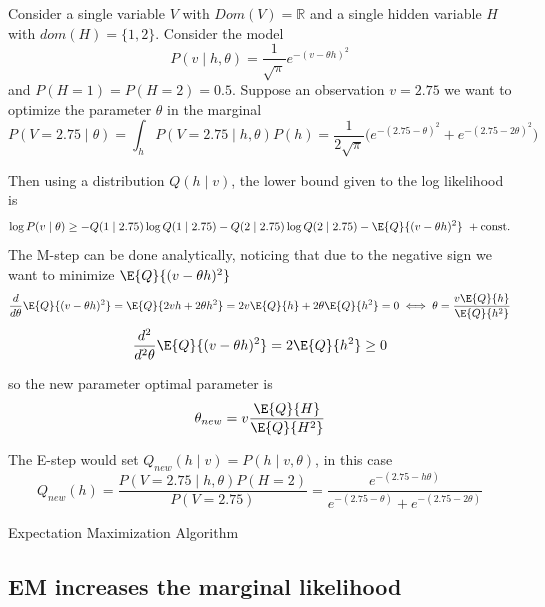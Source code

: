 \begin{exampleth}
  Consider a single variable \(V\) with \(Dom(V) = \mathbb{R}\) and a single hidden variable \(H\) with \(dom(H) = \{1,2\}\). Consider the model
  \[
    P(v \mid h, \theta) = \frac{1}{\sqrt{\pi}}e^{-(v - \theta h)^{2}}
  \]
  and \(P(H = 1) = P(H = 2) = 0.5\). Suppose an observation \(v = 2.75\) we want to optimize the parameter \(\theta\) in the marginal
  \[
    P(V = 2.75 \mid \theta) = \int_{h} P(V = 2.75 \mid h, \theta) P(h) = \frac{1}{2\sqrt{\pi}}\big( e^{-(2.75 - \theta)^{2}} + e^{-(2.75 - 2\theta)^{2}} \big)
  \]

  Then using a distribution \(Q(h \mid v)\), the lower bound given to the log likelihood is
  \[
    \log{P(v \mid \theta)} \geq -Q(1 \mid 2.75)\log{Q(1 \mid 2.75)} - Q(2 \mid 2.75)\log{Q(2 \mid 2.75)} - \E{Q}{(v - \theta h)^{2}}\ + \text{const.}
  \]
  The M-step can be done analytically, noticing that due to the negative sign we want to minimize \(\E{Q}{(v - \theta h)^{2}}\)
  \[
    \frac{d}{d\theta}\E{Q}{(v - \theta h)^{2}} = \E{Q}{ 2 v h + 2\theta h^{2} } = 2v\E{Q}{h} + 2\theta \E{Q}{h^{2}} = 0 \iff \theta = \frac{v\E{Q}{h}}{\E{Q}{h^{2}}}
  \]
  \[
     \frac{d^{2}}{d^{2}\theta}\E{Q}{(v - \theta h)^{2}} = 2\E{Q}{h^{2}} \geq 0
  \]

  so the new parameter optimal parameter is
  \[
    \theta_{new} = v \frac{\E{Q}{H}}{\E{Q}{H^{2}}}
  \]

  The E-step would set \(Q_{new}(h \mid v) = P(h \mid v , \theta)\), in this case
  \[
    Q_{new}(h) = \frac{P(V = 2.75 \mid h, \theta)P(H = 2)}{P(V = 2.75)} = \frac{e^{-(2.75-h\theta)}}{ e^{-(2.75-\theta)} + e^{-(2.75-2\theta)}  }
  \]
\end{exampleth}

 \begin{algorithm}[t]
  \SetAlgoLined
  \KwRet{\(\theta\)}\;
  \caption{Expectation Maximization Algorithm}\label{alg:em}
\end{algorithm}

\subsection{EM increases the marginal likelihood}

